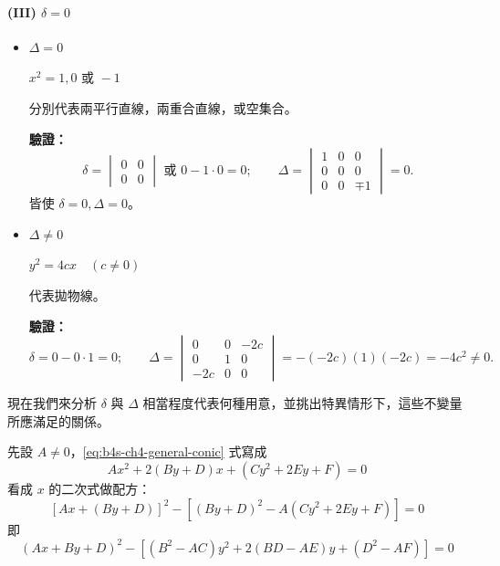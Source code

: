 \paragraph*{(III) $\delta = 0$}
\begin{itemize}
  \item[(i)] $\Delta = 0$
  \begin{example}
  $x^2 = 1, 0 \text{ 或 } -1$
  
  分別代表兩平行直線，兩重合直線，或空集合。
  
  \textbf{驗證：}
  \[
  \delta = \begin{vmatrix} 0 & 0 \\ 0 & 0 \end{vmatrix} \text{ 或 } 0 - 1 \cdot 0 = 0; \qquad
  \Delta = \begin{vmatrix} 1 & 0 & 0 \\ 0 & 0 & 0 \\ 0 & 0 & \mp 1 \end{vmatrix} = 0.
  \]
  皆使 $\delta = 0, \Delta = 0$。
  \end{example}

  \item[(ii)] $\Delta \ne 0$
  \begin{example}
  $y^2 = 4cx \quad (c \ne 0)$
  
  代表拋物線。
  
  \textbf{驗證：}
  \[
  \delta = 0 - 0 \cdot 1 = 0; \qquad
  \Delta = \begin{vmatrix} 0 & 0 & -2c \\ 0 & 1 & 0 \\ -2c & 0 & 0 \end{vmatrix} = -(-2c)(1)(-2c) = -4c^2 \ne 0.
  \]
  \end{example}
\end{itemize}

現在我們來分析 $\delta$ 與 $\Delta$ 相當程度代表何種用意，並挑出特異情形下，這些不變量所應滿足的關係。

先設 $A \ne 0$，\eqref{eq:b4s-ch4-general-conic} 式寫成
\[
Ax^2 + 2(By + D)x + (Cy^2 + 2Ey + F) = 0
\]
看成 $x$ 的二次式做配方：
\[
[Ax + (By + D)]^2 - [(By + D)^2 - A(Cy^2 + 2Ey + F)] = 0
\]
即
\begin{equation}
(Ax + By + D)^2 - [(B^2 - AC)y^2 + 2(BD - AE)y + (D^2 - AF)] = 0
\label{eq:b4s-ch4-complete-square-x}
\end{equation}

